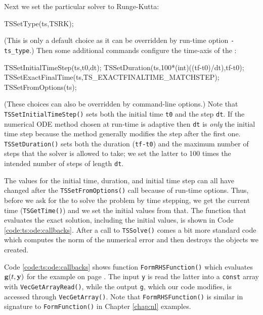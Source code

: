 Next we set the particular \pTS solver to Runge-Kutta:
\begin{code}
  TSSetType(ts,TSRK);
\end{code}
(This is only a default choice as it can be overridden by run-time option \texttt{-ts\_type}.)  Then some additional commands configure the time-axis of the \pTS:
\begin{code}
  TSSetInitialTimeStep(ts,t0,dt);
  TSSetDuration(ts,100*(int)((tf-t0)/dt),tf-t0);
  TSSetExactFinalTime(ts,TS_EXACTFINALTIME_MATCHSTEP);
  TSSetFromOptions(ts);
\end{code}
(These choices can also be overridden by command-line options.)  Note that \texttt{TSSetInitialTimeStep()} sets both the initial time \texttt{t0} and the step \texttt{dt}.  If the numerical ODE method chosen at run-time is adaptive then \texttt{dt} is \emph{only} the initial time step because the method generally modifies the step after the first one.  \texttt{TSSetDuration()} sets both the duration (\texttt{tf-t0}) and the maximum number of steps that the solver is allowed to take; we set the latter to 100 times the intended number of steps of length \texttt{dt}.

The values for the initial time, duration, and initial time step can all have changed after the \texttt{TSSetFromOptions()} call because of run-time options.  Thus, before we ask for the \pTS to solve the problem by time stepping, we get the current time (\texttt{TSGetTime()}) and we set the initial values from that.  The function that evaluates the exact solution, including the initial values, is shown in Code \ref{code:ts:ode:callbacks}.  After a call to \texttt{TSSolve()} comes a bit more standard code which computes the norm of the numerical error and then destroys the objects we created.

Code \ref{code:ts:ode:callbacks} shows function \texttt{FormRHSFunction()} which evaluates $\mathbf{g}(t,\mathbf{y})$ for the example on page \pageref{ex:ts:odeeasy}.  The input \pVec \texttt{y} is read the latter into a \texttt{const} array with \texttt{VecGetArrayRead()}, while the output \pVec \texttt{g}, which our code modifies, is accessed through \texttt{VecGetArray()}.  Note that \texttt{FormRHSFunction()} is similar in signature to \texttt{FormFunction()} in Chapter \ref{chap:nl} examples.


